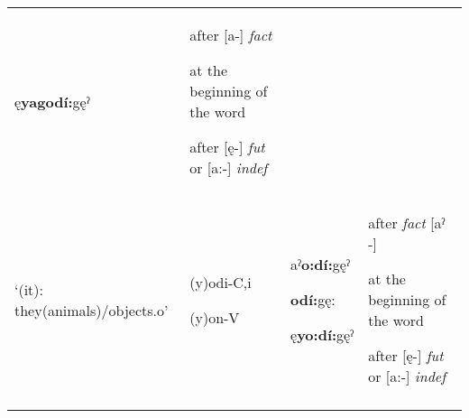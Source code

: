 \begin{table}
{\begin{tabularx}{\textwidth}{XXXX}
ę\textbf{yagodí:}gęˀ & after [a-] \textit{fact}

at the beginning of the word 

after [ę-] \textit{fut} or [a:-] \textit{indef}\\
‘(it): they(animals)/objects.o’ & (y)odi-C,i

(y)on-V & aˀ\textbf{o:dí:}gęˀ

\textbf{odí:}gę:

ę\textbf{yo:dí:}gęˀ & after \textit{fact} [aˀ -] 

at the beginning of the word 

after [ę-] \textit{fut} or [a:-] \textit{indef}\\
\lspbottomrule
\end{tabularx}}
\end{table}


